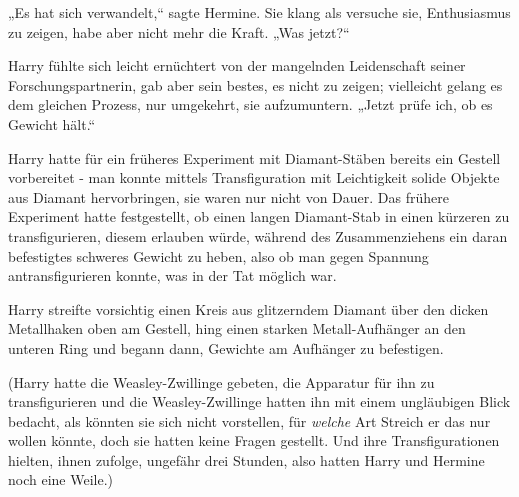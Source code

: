 „Es hat sich verwandelt,“ sagte Hermine. Sie klang als versuche sie, Enthusiasmus zu zeigen, habe aber nicht mehr die Kraft. „Was jetzt?“

Harry fühlte sich leicht ernüchtert von der mangelnden Leidenschaft seiner Forschungspartnerin, gab aber sein bestes, es nicht zu zeigen; vielleicht gelang es dem gleichen Prozess, nur umgekehrt, sie aufzumuntern. „Jetzt prüfe ich, ob es Gewicht hält.“

Harry hatte für ein früheres Experiment mit Diamant-Stäben bereits ein Gestell vorbereitet - man konnte mittels Transfiguration mit Leichtigkeit solide Objekte aus Diamant hervorbringen, sie waren nur nicht von Dauer. Das frühere Experiment hatte festgestellt, ob einen langen Diamant-Stab in einen kürzeren zu transfigurieren, diesem erlauben würde, während des Zusammenziehens ein daran befestigtes schweres Gewicht zu heben, also ob man gegen Spannung antransfigurieren konnte, was in der Tat möglich war.

Harry streifte vorsichtig einen Kreis aus glitzerndem Diamant über den dicken Metallhaken oben am Gestell, hing einen starken Metall-Aufhänger an den unteren Ring und begann dann, Gewichte am Aufhänger zu befestigen.

(Harry hatte die Weasley-Zwillinge gebeten, die Apparatur für ihn zu transfigurieren und die Weasley-Zwillinge hatten ihn mit einem ungläubigen Blick bedacht, als könnten sie sich nicht vorstellen, für \emph{welche} Art Streich er das nur wollen könnte, doch sie hatten keine Fragen gestellt. Und ihre Transfigurationen hielten, ihnen zufolge, ungefähr drei Stunden, also hatten Harry und Hermine noch eine Weile.)

